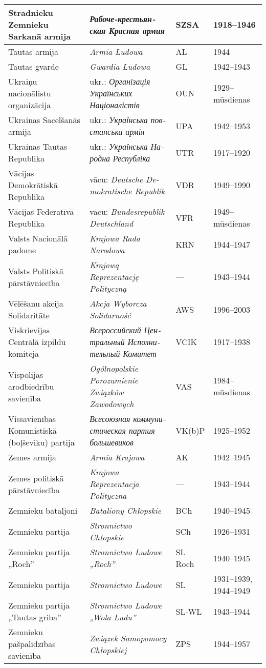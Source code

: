 \documentclass[twoside,a5paper,12pt,fleqn,openany]{extbook}
\newcommand{\pltxti}[1]{\textit{\textpolish{#1}}}
\newcommand{\rutxti}[1]{\textit{\textrussian{#1}}}
\newcommand{\detxti}[1]{\textit{\textgerman{#1}}}
\newcommand{\uktxti}[1]{\textit{\textukrainian{#1}}}
\begin{document}
\begin{footnotesize}
\begin{tabularx}{\linewidth}{|p{3cm}|p{3.5cm}|p{1.4cm}|p{1.6cm}|}
\hline
Strādnieku Zemnieku Sarkanā armija & \rutxti{Рабоче-крестьянская Красная армия} & SZSA & 1918--1946 \\
\hline
Tautas armija & \pltxti{Armia Ludowa} & AL & 1944 \\
\hline
Tautas gvarde & \pltxti{Gwardia Ludowa} & GL & 1942--1943 \\
\hline
Ukraiņu nacionālistu organizācija & ukr.: \uktxti{Організація Українських Націоналістів} & OUN & 1929--mūsdienas \\
\hline
Ukrainas Sacelšanās armija & ukr.: \uktxti{Українська повстанська армія} & UPA & 1942--1953 \\
\hline
Ukrainas Tautas Republika & ukr.: \uktxti{Українська Народна Республіка} & UTR & 1917--1920 \\
\hline
Vācijas Demokrātiskā Republika & vācu: \detxti{Deutsche Demokratische Republik} & VDR & 1949--1990 \\
\hline
Vācijas Federatīvā Republika & vācu: \detxti{Bundesrepublik Deutschland} & VFR & 1949--mūsdienas \\
\hline
Valsts Nacionālā padome & \pltxti{Krajowa Rada Narodowa} & KRN & 1944--1947 \\
\hline
Valsts Politiskā pārstāvniecība & \pltxti{Krajową Reprezentację Polityczną} & --- & 1943--1944 \\
\hline
Vēlēšanu akcija Solidaritāte & \pltxti{Akcja Wyborcza Solidarność} & AWS & 1996--2003 \\
\hline
Viskrievijas Centrālā izpildu komiteja & \rutxti{Всероссийский Центральный Исполнительный Комитет} & VCIK & 1917--1938 \\
\hline
Vispolijas arodbiedrību savienība & \pltxti{Ogólnopolskie Porozumienie Związków Zawodowych} & VAS & 1984--mūsdienas \\
\hline
Vissavienības Komunistiskā (boļševiku) partija & \rutxti{Всесоюзная коммунистическая партия большевиков} & VK(b)P & 1925--1952 \\
\hline
Zemes armija & \pltxti{Armia Krajowa} & AK & 1942--1945 \\
\hline
Zemes politiskā pārstāvniecība & \pltxti{Krajowa Reprezentacja Polityczna} & --- & 1943--1944 \\
\hline
Zemnieku bataljoni & \pltxti{Bataliony Chłopskie} & BCh & 1940--1945 \\
\hline
Zemnieku partija & \pltxti{Stronnictwo Chłopskie} & SCh & 1926--1931 \\
\hline
Zemnieku partija „Roch” & \pltxti{Stronnictwo Ludowe „Roch”} & SL Roch & 1940--1945 \\
\hline
Zemnieku partija & \pltxti{Stronnictwo Ludowe} & SL & 1931--1939, 1944--1949 \\
\hline
Zemnieku partija „Tautas griba” & \pltxti{Stronnictwo Ludowe „Wola Ludu”} & SL-WL & 1943--1944 \\
\hline
Zemnieku pašpalīdzības savienība & \pltxti{Związek Samopomocy Chłopskiej} & ZPS & 1944--1957 \\
\hline
\end{tabularx}
\end{footnotesize}
\end{document}
